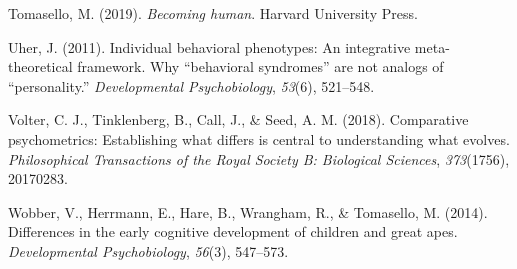 \documentclass[
  man,floatsintext]{apa6}
\newlength{\cslhangindent}
\newlength{\cslentryspacingunit} %
\newenvironment{CSLReferences}[2] %
 {%
  \setlength{\parindent}{0pt}
  \ifodd #1
  \let\oldpar\par
  \def\par{\hangindent=\cslhangindent\oldpar}
  \fi
  \setlength{\parskip}{#2\cslentryspacingunit}
 }%
 {}
\begin{document}
\begin{CSLReferences}{1}{0}
\leavevmode{}%
Tomasello, M. (2019). \emph{Becoming human}. Harvard University Press.

\leavevmode{}%
Uher, J. (2011). Individual behavioral phenotypes: An integrative meta-theoretical framework. Why {``behavioral syndromes''} are not analogs of {``personality.''} \emph{Developmental Psychobiology}, \emph{53}(6), 521--548.

\leavevmode{}%
Volter, C. J., Tinklenberg, B., Call, J., \& Seed, A. M. (2018). Comparative psychometrics: Establishing what differs is central to understanding what evolves. \emph{Philosophical Transactions of the Royal Society B: Biological Sciences}, \emph{373}(1756), 20170283.

\leavevmode{}%
Wobber, V., Herrmann, E., Hare, B., Wrangham, R., \& Tomasello, M. (2014). Differences in the early cognitive development of children and great apes. \emph{Developmental Psychobiology}, \emph{56}(3), 547--573.

\end{CSLReferences}

\endgroup
\end{document}
